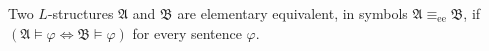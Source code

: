 Two $L$-structures $\mathfrak{A}$ and $\mathfrak{B}$ are elementary equivalent, in symbols $\mathfrak{A} \equiv_{\text{ee}} \mathfrak{B}$, if $(\mathfrak{A} \models \varphi \iff \mathfrak{B} \models \varphi)$ for every sentence $\varphi$.
